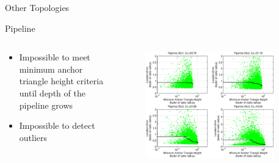 \documentclass{beamer}
\begin{document}
\begin{frame}{Other Topologies}
\begin{block}{Pipeline}
\begin{columns}
	\begin{column}[T]{0.3\textwidth}
		\begin{itemize}
			\item Impossible to meet minimum anchor triangle height criteria until depth of the pipeline grows
			\item Impossible to detect outliers
		\end{itemize}
		\vfill
	\end{column}
	\begin{column}[T]{0.7\textwidth}
		\begin{figure}
			\centering
				\includegraphics[width=0.9\textwidth]{pipeline/HeightIndicator_pipes}
		\end{figure}
	\end{column}
\end{columns}
\end{block}	
\end{frame}
\end{document}
